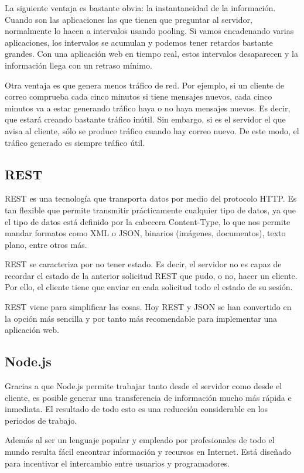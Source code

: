 La siguiente ventaja es bastante obvia: la instantaneidad de la información. Cuando son las aplicaciones las que tienen que preguntar al servidor, normalmente lo hacen a intervalos usando pooling. Si vamos encadenando varias aplicaciones, los intervalos se acumulan y podemos tener retardos bastante grandes. Con una aplicación web en tiempo real, estos intervalos desaparecen y la información llega con un retraso mínimo.

Otra ventaja es que genera menos tráfico de red. Por ejemplo, si un cliente de correo comprueba cada cinco minutos si tiene mensajes nuevos, cada cinco minutos va a estar generando tráfico haya o no haya mensajes nuevos. Es decir, que estará creando bastante tráfico inútil. Sin embargo, si es el servidor el que avisa al cliente, sólo se produce tráfico cuando hay correo nuevo. De este modo, el tráfico generado es siempre tráfico útil.

\subsection{REST}

REST es una tecnología que transporta datos por medio del protocolo HTTP. Es tan flexible que permite transmitir prácticamente cualquier tipo de datos, ya que el tipo de datos está definido por la cabecera Content-Type, lo que nos permite mandar formatos como XML o JSON, binarios (imágenes, documentos), texto plano, entre otros más.

REST se caracteriza por no tener estado. Es decir, el servidor no es capaz de recordar el estado de la anterior solicitud REST que pudo, o no, hacer un cliente. Por ello, el cliente tiene que enviar en cada solicitud todo el estado de su sesión.

REST viene para simplificar las cosas. Hoy REST y JSON se han convertido en la opción más sencilla y por tanto más recomendable para implementar una aplicación web.

\subsection{Node.js}

Gracias a que Node.js permite trabajar tanto desde el servidor como desde el cliente, es posible generar una transferencia de información mucho más rápida e inmediata. El resultado de todo esto es una reducción considerable en los periodos de trabajo.

Además al ser un lenguaje popular y empleado por profesionales de todo el mundo resulta fácil encontrar información y recursos en Internet. Está diseñado para incentivar el intercambio entre usuarios y programadores.

